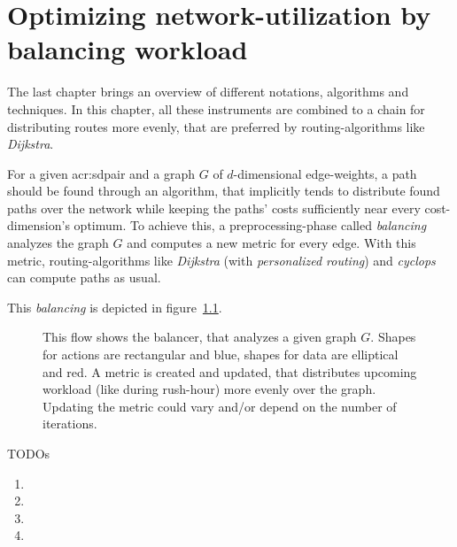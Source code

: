 \chapter{Optimizing network-utilization by balancing workload}
\label{chap:balancing}

The last chapter brings an overview of different notations, algorithms and techniques.
In this chapter, all these instruments are combined to a chain for distributing routes more evenly, that are preferred by routing-algorithms like \textit{Dijkstra}.

For a given \gls{acr:sdpair} and a graph $G$ of $d$-dimensional edge-weights, a path should be found through an algorithm, that implicitly tends to distribute found paths over the network while keeping the paths' costs sufficiently near every cost-dimension's optimum.
To achieve this, a preprocessing-phase called \textit{balancing} analyzes the graph $G$ and computes a new metric for every edge.
With this metric, routing-algorithms like \textit{Dijkstra}  (with \textit{personalized routing}) and \textit{cyclops} can compute paths as usual.

This \textit{balancing} is depicted in figure~\ref{fig:balancing}.

\begin{figure}
    \centering
    
    \caption[Overview of balancing a graph]{%
        This flow shows the balancer, that analyzes a given graph $G$.
        Shapes for actions are rectangular and blue, shapes for data are elliptical and red.
        A metric is created and updated, that distributes upcoming workload (like during rush-hour) more evenly over the graph.
        Updating the metric could vary and/or depend on the number of iterations.
        \label{fig:balancing}
    }
\end{figure}


TODOs
\begin{enumerate}
    \item {}
    \item {}
    \item {}
    \item {}
\end{enumerate}

